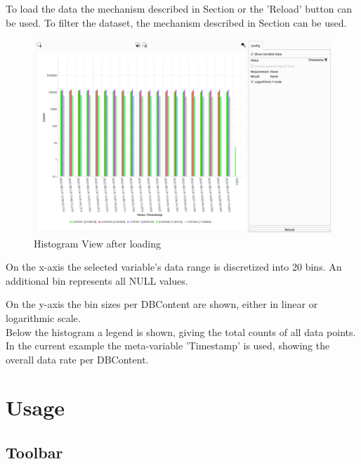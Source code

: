 To load the data the mechanism described in Section  or the 'Reload' button can be used. To filter the dataset, the mechanism described in Section  can be used. \\

\begin{figure}[H]
    \hspace*{-2cm}
    \includegraphics[width=18cm,frame]{figures/histogram_loaded.png}
  \caption{Histogram View after loading}
\end{figure}

On the x-axis the selected variable's data range is discretized into 20 bins. An additional bin represents all NULL values.

On the y-axis the bin sizes per DBContent are shown, either in linear or logarithmic scale. \\

Below the histogram a legend is shown, giving the total counts of all data points. \\

In the current example the meta-variable 'Timestamp' is used, showing the overall data rate per DBContent.

\section{Usage}

\subsection{Toolbar}

